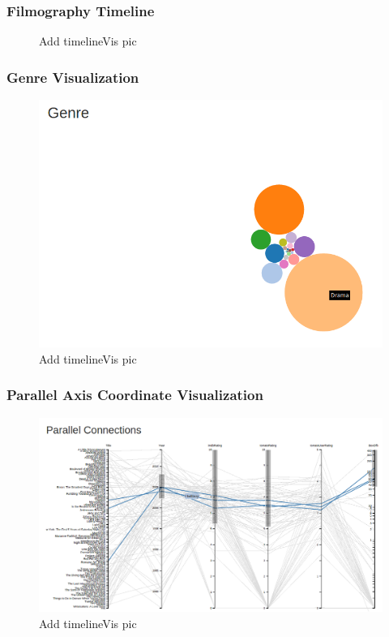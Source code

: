 \documentclass[12pt]{article}
\begin{document}
\subsubsection{Filmography Timeline}

		\begin{figure}[h!]
			\centering
			\caption{Add timelineVis pic}
		\end{figure}

\subsubsection{Genre Visualization}

		\begin{figure}[h!]
			\centering
			\includegraphics[scale=0.3]{images/genreVis.png}
			\caption{Add timelineVis pic}
		\end{figure}

\subsubsection{Parallel Axis Coordinate Visualization}

			\begin{figure}[h!]
				\centering
				\includegraphics[scale=0.3]{images/parallelAxisCoordVis.png}
				\caption{Add timelineVis pic}
			\end{figure}
\end{document}
